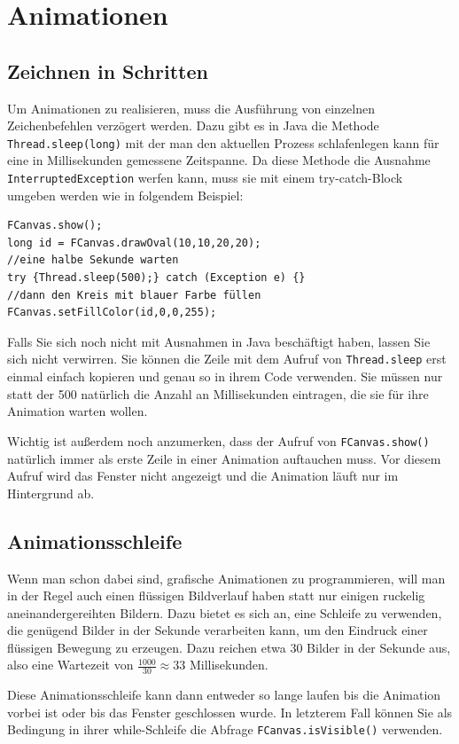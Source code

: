 \documentclass{article}
\newcommand{\enquote}[1]{\glqq{}#1\grqq{}}
\begin{document}
\section{Animationen}
\subsection{Zeichnen in Schritten}
Um Animationen zu realisieren, muss die Ausführung von einzelnen Zeichenbefehlen verzögert werden. Dazu gibt es in Java die Methode {\tt Thread.sleep(long)} mit der man den aktuellen Prozess \enquote{schlafenlegen} kann für eine in Millisekunden gemessene Zeitspanne. Da diese Methode die Ausnahme {\tt InterruptedException} werfen kann, muss sie mit einem try-catch-Block umgeben werden wie in folgendem Beispiel:

\begin{lstlisting}
FCanvas.show();
long id = FCanvas.drawOval(10,10,20,20);
//eine halbe Sekunde warten
try {Thread.sleep(500);} catch (Exception e) {}
//dann den Kreis mit blauer Farbe füllen
FCanvas.setFillColor(id,0,0,255);
\end{lstlisting}

Falls Sie sich noch nicht mit Ausnahmen in Java beschäftigt haben, lassen Sie sich nicht verwirren. Sie können die Zeile mit dem Aufruf von {\tt Thread.sleep} erst einmal einfach kopieren und genau so in ihrem Code verwenden. Sie müssen nur statt der 500 natürlich die Anzahl an Millisekunden eintragen, die sie für ihre Animation warten wollen.

Wichtig ist außerdem noch anzumerken, dass der Aufruf von {\tt FCanvas.show()} natürlich immer als erste Zeile in einer Animation auftauchen muss. Vor diesem Aufruf wird das Fenster nicht angezeigt und die Animation läuft nur im Hintergrund ab.

\subsection{Animationsschleife}
Wenn man schon dabei sind, grafische Animationen zu programmieren, will man in der Regel auch einen flüssigen Bildverlauf haben statt nur einigen \enquote{ruckelig} aneinandergereihten Bildern. Dazu bietet es sich an, eine Schleife zu verwenden, die genügend Bilder in der Sekunde verarbeiten kann, um den Eindruck einer flüssigen Bewegung zu erzeugen. Dazu reichen etwa 30 Bilder in der Sekunde aus, also eine Wartezeit von $\frac{1000}{30} \approx 33$ Millisekunden.

Diese Animationsschleife kann dann entweder so lange laufen bis die Animation vorbei ist oder bis das Fenster geschlossen wurde. In letzterem Fall können Sie als Bedingung in ihrer while-Schleife die Abfrage {\tt FCanvas.isVisible()} verwenden.
\end{document}
